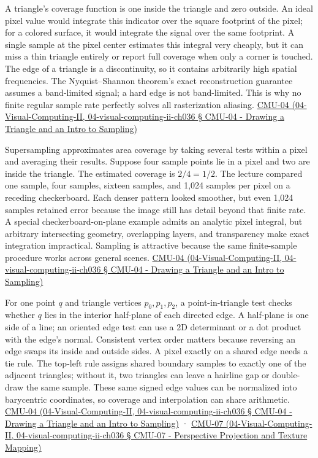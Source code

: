 A triangle's coverage function is one inside the triangle and zero outside. An ideal pixel value would integrate this indicator over the square footprint of the pixel; for a colored surface, it would integrate the signal over the same footprint. A single sample at the pixel center estimates this integral very cheaply, but it can miss a thin triangle entirely or report full coverage when only a corner is touched. The edge of a triangle is a discontinuity, so it contains arbitrarily high spatial frequencies. The Nyquist--Shannon theorem's exact reconstruction guarantee assumes a band-limited signal; a hard edge is not band-limited. This is why no finite regular sample rate perfectly solves all rasterization aliasing. \href{}{CMU-04 (04-Visual-Computing-II, 04-visual-computing-ii-ch036 § CMU-04 - Drawing a Triangle and an Intro to Sampling)}

Supersampling approximates area coverage by taking several tests within a pixel and averaging their results. Suppose four sample points lie in a pixel and two are inside the triangle. The estimated coverage is \(2/4=1/2\). The lecture compared one sample, four samples, sixteen samples, and 1,024 samples per pixel on a receding checkerboard. Each denser pattern looked smoother, but even 1,024 samples retained error because the image still has detail beyond that finite rate. A special checkerboard-on-plane example admits an analytic pixel integral, but arbitrary intersecting geometry, overlapping layers, and transparency make exact integration impractical. Sampling is attractive because the same finite-sample procedure works across general scenes. \href{}{CMU-04 (04-Visual-Computing-II, 04-visual-computing-ii-ch036 § CMU-04 - Drawing a Triangle and an Intro to Sampling)}

For one point \(q\) and triangle vertices \(p_0,p_1,p_2\), a point-in-triangle test checks whether \(q\) lies in the interior half-plane of each directed edge. A half-plane is one side of a line; an oriented edge test can use a 2D determinant or a dot product with the edge's normal. Consistent vertex order matters because reversing an edge swaps its inside and outside sides. A pixel exactly on a shared edge needs a tie rule. The top-left rule assigns shared boundary samples to exactly one of the adjacent triangles; without it, two triangles can leave a hairline gap or double-draw the same sample. These same signed edge values can be normalized into barycentric coordinates, so coverage and interpolation can share arithmetic. \href{}{CMU-04 (04-Visual-Computing-II, 04-visual-computing-ii-ch036 § CMU-04 - Drawing a Triangle and an Intro to Sampling)} · \href{}{CMU-07 (04-Visual-Computing-II, 04-visual-computing-ii-ch036 § CMU-07 - Perspective Projection and Texture Mapping)}

